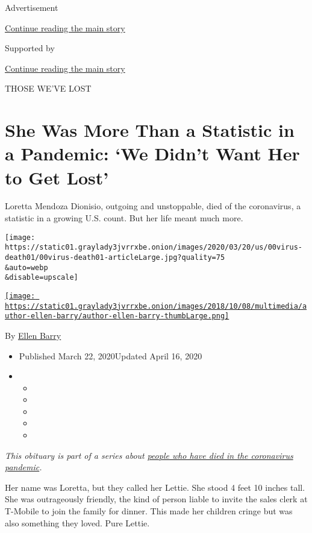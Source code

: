Advertisement

\protect\hyperlink{after-top}{Continue reading the main story}

Supported by

\protect\hyperlink{after-sponsor}{Continue reading the main story}

THOSE WE'VE LOST

\hypertarget{she-was-more-than-a-statistic-in-a-pandemic-we-didnt-want-her-to-get-lost}{%
\section{She Was More Than a Statistic in a Pandemic: `We Didn't Want
Her to Get
Lost'}\label{she-was-more-than-a-statistic-in-a-pandemic-we-didnt-want-her-to-get-lost}}

Loretta Mendoza Dionisio, outgoing and unstoppable, died of the
coronavirus, a statistic in a growing U.S. count. But her life meant
much more.

\texttt{[image: https://static01.graylady3jvrrxbe.onion/images/2020/03/20/us/00virus-death01/00virus-death01-articleLarge.jpg?quality=75\\\&auto=webp\\\&disable=upscale]}

\href{https://www.nytimes3xbfgragh.onion/by/ellen-barry}{\texttt{[image: https://static01.graylady3jvrrxbe.onion/images/2018/10/08/multimedia/author-ellen-barry/author-ellen-barry-thumbLarge.png]}}

By \href{https://www.nytimes3xbfgragh.onion/by/ellen-barry}{Ellen Barry}

\begin{itemize}
\item
  Published March 22, 2020Updated April 16, 2020
\item
  \begin{itemize}
  \item
  \item
  \item
  \item
  \item
  \end{itemize}
\end{itemize}

\emph{This obituary is part of a series about}
\href{https://www.nytimes3xbfgragh.onion/series/people-who-have-died-of-the-coronavirus}{\emph{people
who have died in the coronavirus pandemic}}\emph{.}

Her name was Loretta, but they called her Lettie. She stood 4 feet 10
inches tall. She was outrageously friendly, the kind of person liable to
invite the sales clerk at T-Mobile to join the family for dinner. This
made her children cringe but was also something they loved. Pure Lettie.

